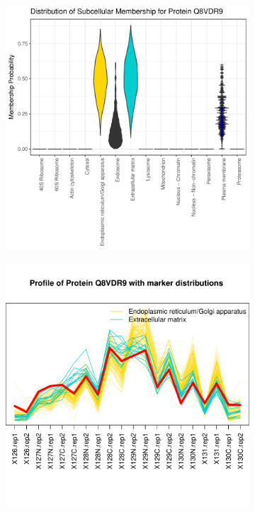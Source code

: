 \documentclass[12pt,english]{article}
\begin{document}
\begin{figure}[h]
  \centering
  \begin{subfigure}[t]{0.5\textwidth}
    \centering
\includegraphics{tagm-023}
    \caption{}
  \end{subfigure}%
  \begin{subfigure}[t]{0.5\textwidth}
    \centering
\includegraphics{tagm-024}

\end{subfigure}
\end{figure}
\end{document}
